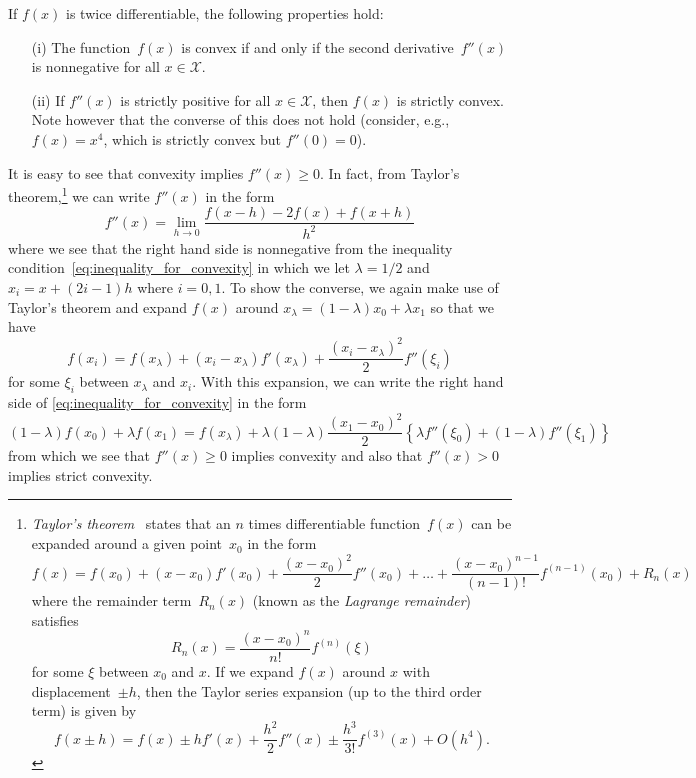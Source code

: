\documentclass[12pt,a4paper]{article}
\begin{document}
If $f(x)$ is twice differentiable, the following properties hold:
\begin{itemize}
\item[(i)]
The function~$f(x)$ is convex if and only if the second derivative~$f''(x)$ is nonnegative
for all $x \in \mathcal{X}$.
\item[(ii)]
If $f''(x)$ is strictly positive for all $x \in \mathcal{X}$, then $f(x)$ is strictly convex.
Note however that the converse of this does not hold (consider, e.g., $f(x) = x^4$,
which is strictly convex but $f''(0) = 0$).
\end{itemize}
It is easy to see that convexity implies $f''(x) \geqslant 0$.
In fact, from Taylor's theorem,\footnote{%
\emph{Taylor's theorem}~\citep{AS:Handbook} states that
an $n$ times differentiable function~$f(x)$
can be expanded around a given point~$x_0$ in the form
\begin{equation}
f(x) = f(x_0) + (x - x_0) f'(x_0) +\frac{(x - x_0)^2}{2} f''(x_0) + \dots +
\frac{(x - x_0)^{n - 1}}{(n - 1)!} f^{(n - 1)}(x_0) + R_n(x)
\end{equation}
where the remainder term~$R_n(x)$ (known as the \emph{Lagrange remainder}) satisfies
\begin{equation}
R_n(x) = \frac{(x - x_0)^{n}}{n!} f^{(n)}(\xi)
\end{equation}
for some $\xi$ between $x_0$ and $x$.
If we expand $f(x)$ around $x$ with displacement~$\pm h$,
then the Taylor series expansion (up to the third order term) is given by
\begin{equation}
f(x \pm h) =
f(x) \pm h f'(x) + \frac{h^2}{2} f''(x) \pm \frac{h^3}{3!} f^{(3)}(x) + O\left(h^4\right) .
\end{equation}
}
we can write $f''(x)$ in the form
\begin{equation}
f''(x) = \lim_{h \to 0} \frac{f(x - h) - 2 f(x) + f(x + h)}{h^2}
\end{equation}
where we see that the right hand side is nonnegative
from the inequality condition~\eqref{eq:inequality_for_convexity}
in which we let $\lambda = 1/2$ and $x_i = x + (2i - 1) h$ where $i = 0, 1$.
To show the converse,
we again make use of Taylor's theorem and
expand $f(x)$ around $x_{\lambda} = (1 - \lambda) x_0 + \lambda x_1$
so that we have
\begin{equation}
f(x_i) = f(x_{\lambda}) + (x_i - x_{\lambda}) f' (x_{\lambda})
+ \frac{(x_i - x_{\lambda})^2}{2} f''(\xi_i)
\end{equation}
for some $\xi_i$ between $x_{\lambda}$ and $x_i$.
With this expansion,
we can write the right hand side of \eqref{eq:inequality_for_convexity} in the form
\begin{equation}
(1 - \lambda) f(x_0) + \lambda f(x_1)
= f(x_{\lambda})
+ \lambda (1 - \lambda) \frac{(x_1 - x_0)^2}{2}
\left\{
\lambda f''(\xi_0) + (1 - \lambda) f''(\xi_1)
\right\}
\end{equation}
from which we see that $f''(x) \geqslant 0$ implies convexity
and also that $f''(x) > 0$ implies strict convexity.
\end{document}
